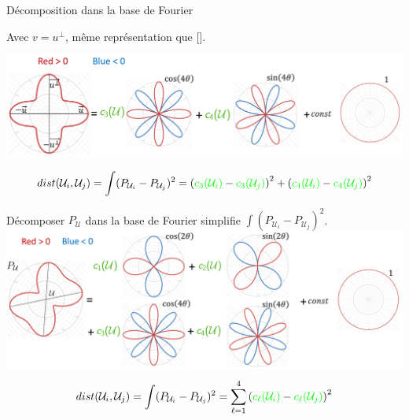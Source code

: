 \begin{frame}{Décomposition dans la base de Fourier}
    \centering
    \begin{overprint}
     \centering
    Avec $v = u^{\perp}$, même représentation que [\cite{palacios_rotational_2007}].
    
    \includegraphics[width=0.95\linewidth]{img_spm_ff/ortho_decomposition_with_circle.PNG}
    
    $$ dist(\mathcal{U}_i, \mathcal{U}_j) =  \int (P_{\mathcal{U}_i} - P_{\mathcal{U}_j})^2 =  \left({\color{green}c_3(\mathcal{U}_i)} - {\color{green}c_3(\mathcal{U}_j)} \right)^2 
    + \left({\color{green}c_4(\mathcal{U}_i)} - {\color{green}c_4(\mathcal{U}_j)} \right)^2$$
     \centering
    
    Décomposer $P_\mathcal{U}$ dans la base de Fourier simplifie $\displaystyle\int (P_{\mathcal{U}_i} - P_{\mathcal{U}_j})^2$. \\
    \includegraphics[width=0.95\linewidth]{img_spm_ff/polynome_decomposition_with_circle.PNG}
    $$ dist(\mathcal{U}_i, \mathcal{U}_j) =  \int (P_{\mathcal{U}_i} - P_{\mathcal{U}_j})^2 = \sum_{\ell=1}^4 \left({\color{green}c_\ell(\mathcal{U}_i)} - {\color{green}c_\ell(\mathcal{U}_j)} \right)^2$$
    \end{overprint}
    
\end{frame} 

